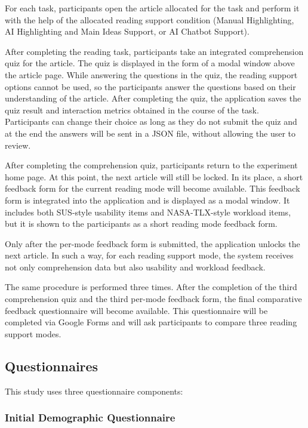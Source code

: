 \documentclass{IEEEtran}
\begin{document}
For each task, participants open the article allocated for the task and perform it with the help of the allocated reading support condition (Manual Highlighting, AI Highlighting and Main Ideas Support, or AI Chatbot Support).

After completing the reading task, participants take an integrated comprehension quiz for the article. The quiz is displayed in the form of a modal window above the article page. While answering the questions in the quiz, the reading support options cannot be used, so the participants answer the questions based on their understanding of the article. After completing the quiz, the application saves the quiz result and interaction metrics obtained in the course of the task. Participants can change their choice as long as they do not submit the quiz and at the end the answers will be sent in a JSON file, without allowing the user to review.

After completing the comprehension quiz, participants return to the experiment home page. At this point, the next article will still be locked. In its place, a short feedback form for the current reading mode will become available. This feedback form is integrated into the application and is displayed as a modal window. It includes both SUS-style usability items and NASA-TLX-style workload items, but it is shown to the participants as a short reading mode feedback form.

Only after the per-mode feedback form is submitted, the application unlocks the next article. In such a way, for each reading support mode, the system receives not only comprehension data but also usability and workload feedback.

The same procedure is performed three times. After the completion of the third comprehension quiz and the third per-mode feedback form, the final comparative feedback questionnaire will become available. This questionnaire will be completed via Google Forms and will ask participants to compare three reading support modes.

\subsection{Questionnaires}

This study uses three questionnaire components:

\subsubsection{Initial Demographic Questionnaire}
\end{document}
